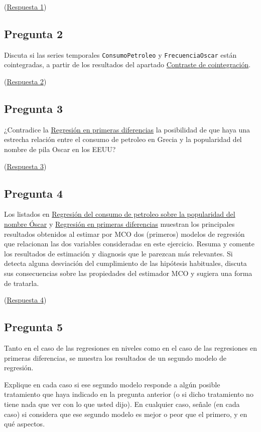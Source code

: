 \documentclass[10pt]{article}
\begin{document}
(\hyperref[sec:orge832e22]{Respuesta 1})
\subsection*{Pregunta 2}
\label{sec:org89f97d3}

Discuta si las series temporales \texttt{ConsumoPetroleo} y \texttt{FrecuenciaOscar}
están cointegradas, a partir de los resultados del apartado \hyperref[sec:org21dd2ed]{Contraste de cointegración}.

(\hyperref[sec:orgecbbcab]{Respuesta 2})
\subsection*{Pregunta 3}
\label{sec:orga761262}

¿Contradice la \hyperref[sec:orgbc115b4]{Regresión en primeras diferencias} la posibilidad de que
haya una estrecha relación entre el consumo de petroleo en Grecia y la
popularidad del nombre de pila Oscar en los EEUU?

(\hyperref[sec:orgd1f6bde]{Respuesta 3})
\subsection*{Pregunta 4}
\label{sec:org255901b}

Los listados en \hyperref[sec:orgd830702]{Regresión del consumo de petroleo sobre la popularidad del nombre Óscar} y \hyperref[sec:orgbc115b4]{Regresión en primeras diferencias} muestran los
principales resultados obtenidos al estimar por MCO dos (primeros)
modelos de regresión que relacionan las dos variables consideradas en
este ejercicio. Resuma y comente los resultados de estimación y
diagnosis que le parezcan más relevantes. Si detecta alguna desviación
del cumplimiento de las hipótesis habituales, discuta sus
consecuencias sobre las propiedades del estimador MCO y sugiera una
forma de tratarla.

(\hyperref[sec:org656792d]{Respuesta 4})
\subsection*{Pregunta 5}
\label{sec:org2fcc0fe}

Tanto en el caso de las regresiones en niveles como en el caso de las
regresiones en primeras diferencias, se muestra los resultados de un
segundo modelo de regresión.

Explique en cada caso si ese segundo modelo responde a algún posible
tratamiento que haya indicado en la pregunta anterior (o si dicho
tratamiento no tiene nada que ver con lo que usted dijo). En cualquier
caso, señale (en cada caso) si considera que ese segundo modelo es
mejor o peor que el primero, y en qué aspectos.
\end{document}
